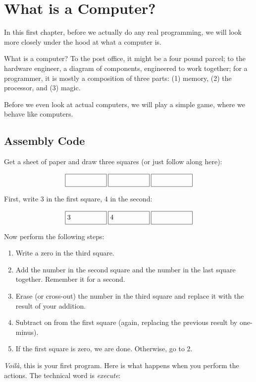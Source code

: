 \chapter{What is a Computer?}

In this first chapter, before we actually do any real programming, we will look
more closely under the hood at what a computer is.

What is a computer? To the post office, it might be a four pound parcel; to the
hardware engineer, a diagram of components, engineered to work together; for a
programmer, it is mostly a composition of three parts: (1) memory, (2) the
processor, and (3) magic.

Before we even look at actual computers, we will play a simple game, where we
behave like computers.

\section{Assembly Code}%
\newcommand\dorect[1]{\framebox[6em]{\ensuremath{#1}\strut\hfill}}%
\newcommand\dostate[3]{\dorect{#1}\hspace{2pt}\dorect{#2}\hspace{2pt}\dorect{#3}}

Get a sheet of paper and draw three squares (or just follow along here):

\[
\dostate{}{}{}
\]

First, write 3 in the first square, 4 in the second:

\[
\dostate{3}{4}{\strut}
\]

Now perform the following steps:

\begin{enumerate}
\item Write a zero in the third square.
\item Add the number in the second square and the number in the last square
together. Remember it for a second.
\item Erase (or cross-out) the number in the third square and replace it with
the result of your addition.
\item Subtract on from the first square (again, replacing the previous result
by one-minus).
\item If the first square is zero, we are done. Otherwise, go to 2.
\end{enumerate}

\emph{Voilà}, this is your first program. Here is what happens when you perform
the actions. The technical word is \emph{execute}:

